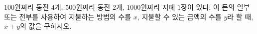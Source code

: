 $100$원짜리 동전 $4$개, $500$원짜리 동전 $2$개, $1000$원짜리 지폐 $1$장이 있다. 이 돈의 일부 또는 전부를 사용하여 지불하는 방법의 수를 $x$, 지불할 수 있는 금액의 수를 $y$라 할 때, $x+y$의 값을 구하시오. 
